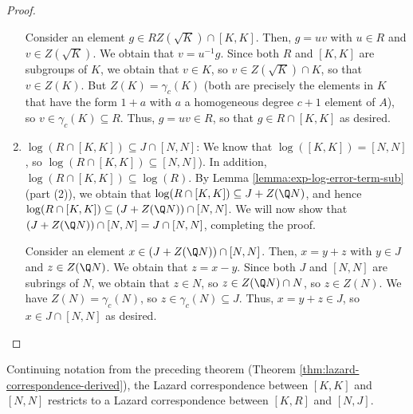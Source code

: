 \documentclass{ucetd}
\begin{document}
\begin{proof}
\begin{enumerate}
    Consider an element $g \in RZ(\sqrt{K}) \cap [K,K]$. Then, $g =
    uv$ with $u \in R$ and $v \in Z(\sqrt{K})$. We obtain that $v =
    u^{-1}g$. Since both $R$ and $[K,K]$ are subgroups of $K$, we
    obtain that $v \in K$, so $v \in Z(\sqrt{K}) \cap K$, so that $v
    \in Z(K)$. But $Z(K) = \gamma_c(K)$ (both are precisely the
    elements in $K$ that have the form $1 + a$ with $a$ a homogeneous
    degree $c + 1$ element of $A$), so $v \in \gamma_c(K) \subseteq
    R$. Thus, $g = uv \in R$, so that $g \in R \cap [K,K]$ as desired.
  \item $\log(R \cap [K,K]) \subseteq J \cap [N,N]$: We know that
    $\log([K,K]) = [N,N]$, so $\log(R \cap [K,K]) \subseteq
    [N,N]$). In addition, $\log(R \cap [K,K]) \subseteq \log(R)$. By
    Lemma \ref{lemma:exp-log-error-term-sub} (part (2)), we obtain
    that $\log(R \cap [K,K]) \subseteq J + Z(\Q N)$, and hence $\log(R
    \cap [K,K]) \subseteq (J + Z(\Q N)) \cap [N,N]$. We will now show
    that $(J + Z(\Q N)) \cap [N,N] = J \cap [N,N]$, completing the
    proof.

    Consider an element $x \in (J + Z(\Q N)) \cap [N,N]$. Then, $x= y
    + z$ with $y \in J$ and $z \in Z(\Q N)$. We obtain that $z = x -
    y$. Since both $J$ and $[N,N]$ are subrings of $N$, we obtain that
    $z \in N$, so $z \in Z(\Q N) \cap N$, so $z \in Z(N)$. We have
    $Z(N) = \gamma_c(N)$, so $z \in \gamma_c(N) \subseteq J$. Thus, $x
    = y + z \in J$, so $x \in J \cap [N,N]$ as desired.
  \end{enumerate}
\end{proof}

\begin{theorem}\label{thm:lazard-correspondence-commutator-lie}
  Continuing notation from the preceding theorem (Theorem
  \ref{thm:lazard-correspondence-derived}), the Lazard correspondence
  between $[K,K]$ and $[N,N]$ restricts to a Lazard correspondence
  between $[K,R]$ and $[N,J]$.
\end{theorem}
\end{document}
